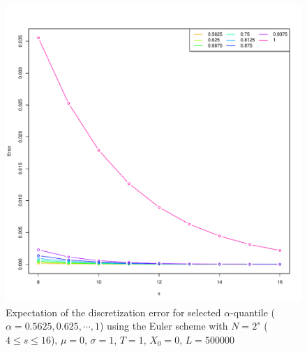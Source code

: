 \documentclass[cjk]{beamer}
\begin{document}
\begin{frame}
\begin{figure}
   \centering
   \includegraphics[scale=0.4]{nout_0.pdf} %
   \caption{Expectation of the discretization error for selected $\alpha$-quantile ($\alpha = 0.5625, 0.625, \cdots, 1$) using the Euler scheme with $N = 2^s$ ($4\le s \le 16$), $\mu=0$, $\sigma=1$, $T=1$, $X_0=0$, $L=500000$ }
   \label{f:err}
\end{figure}
\end{frame}
\end{document}
